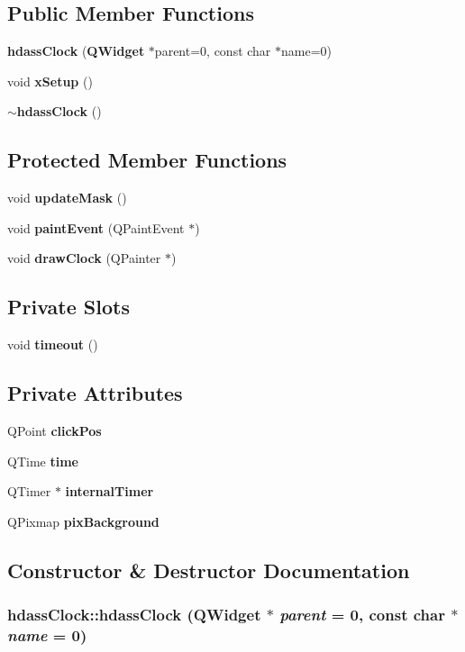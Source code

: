 \subsection*{Public Member Functions}
\begin{CompactItemize}
\item 
{\bf hdass\-Clock} ({\bf QWidget} $\ast$parent=0, const char $\ast$name=0)
\item 
void {\bf x\-Setup} ()
\item 
{\bf $\sim$hdass\-Clock} ()
\end{CompactItemize}
\subsection*{Protected Member Functions}
\begin{CompactItemize}
\item 
void {\bf update\-Mask} ()
\item 
void {\bf paint\-Event} (QPaint\-Event $\ast$)
\item 
void {\bf draw\-Clock} (QPainter $\ast$)
\end{CompactItemize}
\subsection*{Private Slots}
\begin{CompactItemize}
\item 
void {\bf timeout} ()
\end{CompactItemize}
\subsection*{Private Attributes}
\begin{CompactItemize}
\item 
QPoint {\bf click\-Pos}
\item 
QTime {\bf time}
\item 
QTimer $\ast$ {\bf internal\-Timer}
\item 
QPixmap {\bf pix\-Background}
\end{CompactItemize}


\subsection{Constructor \& Destructor Documentation}
\subsubsection{\setlength{\rightskip}{0pt plus 5cm}hdass\-Clock::hdass\-Clock ({\bf QWidget} $\ast$ {\em parent} = 0, const char $\ast$ {\em name} = 0)}\label{classhdassClock_hdassClocka0}




